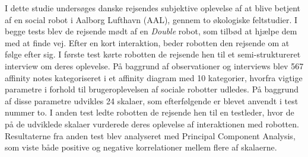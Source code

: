 I dette studie undersøges danske rejsendes subjektive oplevelse af at blive betjent af en social robot i Aalborg Lufthavn (AAL), gennem to økologiske feltstudier. I begge tests blev de rejsende mødt af en \textit{Double} robot, som tilbød at hjælpe dem med at finde vej. Efter en kort interaktion, beder robotten den rejsende om at følge efter sig. I første test kørte robotten de rejsende hen til et semi-struktureret interview om deres oplevelse. På baggrund af observationer og interviews blev 567 affinity notes kategoriseret i et affinity diagram med 10 kategorier, hvorfra vigtige parametre i forhold til brugeroplevelsen af sociale robotter udledes. På baggrund af disse parametre udvikles 24 skalaer, som efterfølgende er blevet anvendt i test nummer to. I anden test ledte robotten de rejsende hen til en testleder, hvor de på de udviklede skalaer vurderede deres oplevelse af interaktionen med robotten. Resultaterne fra anden test blev analyseret med Principal Component Analysis, som viste både positive og negative korrelationer mellem flere af skalaerne.